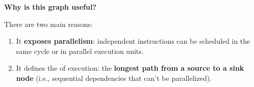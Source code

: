 \highspace
\begin{flushleft}
    \textcolor{Green3}{ \textbf{Why is this graph useful?}}
\end{flushleft}
There are two main reasons:
\begin{enumerate}
    \item It \textbf{exposes parallelism}: independent instructions can be scheduled in the same cycle or in parallel execution units.
    \item It defines the  of execution: the \textbf{longest path from a source to a sink node} (i.e., sequential dependencies that can't be parallelized).
\end{enumerate}